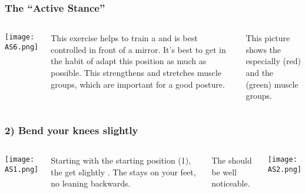 \begin{frame}
\frametitle{The ``Active Stance''}
\begin{columns}[c] %

	\texttt{[image: AS6.png]} %




This exercise helps to train a  and is best controlled in front of a mirror. It's best to get in the habit of adapt this position as much as possible. This strengthens and stretches muscle groups, which are important for a good posture.

This picture shows the especially  (red) and the  (green) muscle groups.
\end{columns}
\end{frame}
\begin{frame}
\frametitle{2) Bend your knees slightly}
\begin{columns}[c] %

	\texttt{[image: AS1.png]}


Starting with the starting position (1), the  get slightly . The  stays  on your feet, no leaning backwards.

The  should be well noticeable.

	\texttt{[image: AS2.png]}
\end{columns}
\end{frame}
